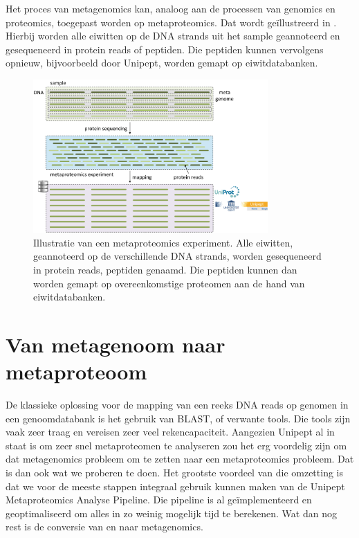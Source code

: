 Het proces van metagenomics kan, analoog aan de processen van genomics en 
proteomics, toegepast worden op metaproteomics. Dat wordt geïllustreerd in 
. Hierbij worden alle eiwitten op de DNA strands uit 
het sample geannoteerd en gesequeneerd in protein reads of peptiden. Die 
peptiden kunnen vervolgens opnieuw, bijvoorbeeld door Unipept, worden gemapt op 
eiwitdatabanken.

\begin{figure}
	\centering \includegraphics[width=0.8\textwidth]{includes/metaproteomics}
	\caption{Illustratie van een metaproteomics experiment. Alle eiwitten,
	geannoteerd op de verschillende DNA strands, worden gesequeneerd in
	protein reads, peptiden genaamd. Die peptiden kunnen dan worden gemapt op
	overeenkomstige proteomen aan de hand van eiwitdatabanken.}
	\label{fig:metaproteomics}
\end{figure}

\section{Van metagenoom naar metaproteoom}
De klassieke oplossing voor de mapping van een reeks DNA reads op genomen in een
genoomdatabank is het gebruik van BLAST, of verwante tools. Die tools zijn vaak
zeer traag en vereisen zeer veel rekencapaciteit.  Aangezien Unipept
al in staat is om zeer snel metaproteomen te analyseren zou het erg voordelig
zijn om dat metagenomics probleem om te zetten naar een metaproteomics probleem.
Dat is dan ook wat we proberen te doen. Het grootste voordeel van die omzetting
is dat we voor de meeste stappen integraal gebruik kunnen maken van de Unipept
Metaproteomics Analyse Pipeline. Die pipeline is al geïmplementeerd en 
geoptimaliseerd om alles in zo weinig mogelijk tijd te berekenen. Wat dan 
nog rest is de conversie van en naar metagenomics.

